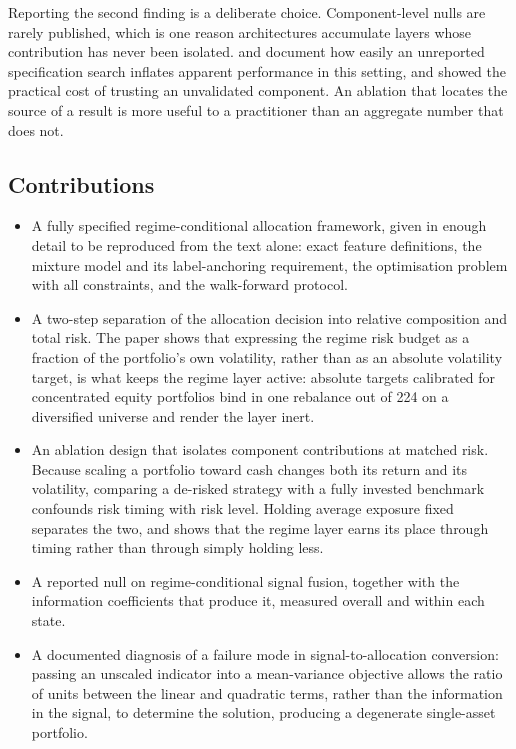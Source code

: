 \documentclass{singlecol-new}
\theoremstyle{TH}{
\newtheorem{lemma}{Lemma}
\newtheorem{theorem}[lemma]{Theorem}
\newtheorem{corrolary}[lemma]{Corrolary}
\newtheorem{conjecture}[lemma]{Conjecture}
\newtheorem{proposition}[lemma]{Proposition}
\newtheorem{claim}[lemma]{Claim}
\newtheorem{stheorem}[lemma]{Wrong Theorem}
\newtheorem{algorithm}{Algorithm}
}
\theoremstyle{THrm}{
\newtheorem{definition}{Definition}[section]
\newtheorem{question}{Question}[section]
\newtheorem{remark}{Remark}
\newtheorem{scheme}{Scheme}
}
\theoremstyle{THhit}{
\newtheorem{case}{Case}[section]
}
\begin{document}
Reporting the second finding is a deliberate choice. Component-level nulls are rarely
published, which is one reason architectures accumulate layers whose contribution has
never been isolated. \citet{harvey15} and \citet{valls26} document how easily an
unreported specification search inflates apparent performance in this setting, and
\citet{demiguel09} showed the practical cost of trusting an unvalidated component. An
ablation that locates the source of a result is more useful to a practitioner than an
aggregate number that does not.

\subsection{Contributions}

\begin{itemize}

\item A fully specified regime-conditional allocation framework, given in enough detail
to be reproduced from the text alone: exact feature definitions, the mixture model and
its label-anchoring requirement, the optimisation problem with all constraints, and the
walk-forward protocol.

\item A two-step separation of the allocation decision into relative composition and
total risk. The paper shows that expressing the regime risk budget as a fraction of the
portfolio's own volatility, rather than as an absolute volatility target, is what keeps
the regime layer active: absolute targets calibrated for concentrated equity portfolios
bind in one rebalance out of 224 on a diversified universe and render the layer inert.

\item An ablation design that isolates component contributions at matched risk. Because
scaling a portfolio toward cash changes both its return and its volatility, comparing a
de-risked strategy with a fully invested benchmark confounds risk timing with risk
level. Holding average exposure fixed separates the two, and shows that the regime
layer earns its place through timing rather than through simply holding less.

\item A reported null on regime-conditional signal fusion, together with the
information coefficients that produce it, measured overall and within each state.

\item A documented diagnosis of a failure mode in signal-to-allocation conversion:
passing an unscaled indicator into a mean-variance objective allows the ratio of units
between the linear and quadratic terms, rather than the information in the signal, to
determine the solution, producing a degenerate single-asset portfolio.

\end{itemize}
\end{document}

